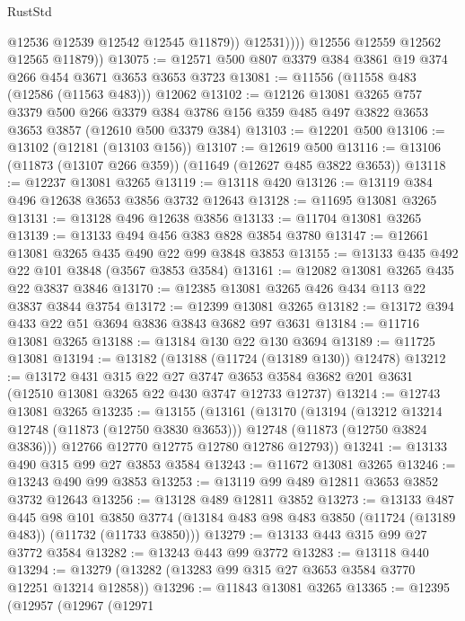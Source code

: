 \begin{lexlean}{RustStd}
\begin{coremodule}
                    @12536
                    @12539
                    @12542
                    @12545
                    @11879))
                @12531))))
        @12556
        @12559
        @12562
        @12565
        @11879))
@13075 := @12571 @500 @807 @3379 @384 @3861 @19 @374 @266 @454 @3671 @3653 @3653 @3723
@13081 := @11556 (@11558 @483 (@12586 (@11563 @483))) @12062
@13102 := @12126
    @13081
    @3265
    @757
    @3379
    @500
    @266
    @3379
    @384
    @3786
    @156
    @359
    @485
    @497
    @3822
    @3653
    @3653
    @3857
    (@12610 @500 @3379 @384)
@13103 := @12201 @500
@13106 := @13102 (@12181 (@13103 @156))
@13107 := @12619 @500
@13116 := @13106 (@11873 (@13107 @266 @359)) (@11649 (@12627 @485 @3822 @3653))
@13118 := @12237 @13081 @3265
@13119 := @13118 @420
@13126 := @13119 @384 @496 @12638 @3653 @3856 @3732 @12643
@13128 := @11695 @13081 @3265
@13131 := @13128 @496 @12638 @3856
@13133 := @11704 @13081 @3265
@13139 := @13133 @494 @456 @383 @828 @3854 @3780
@13147 := @12661 @13081 @3265 @435 @490 @22 @99 @3848 @3853
@13155 := @13133 @435 @492 @22 @101 @3848 (@3567 @3853 @3584)
@13161 := @12082 @13081 @3265 @435 @22 @3837 @3846
@13170 := @12385 @13081 @3265 @426 @434 @113 @22 @3837 @3844 @3754
@13172 := @12399 @13081 @3265
@13182 := @13172 @394 @433 @22 @51 @3694 @3836 @3843 @3682 @97 @3631
@13184 := @11716 @13081 @3265
@13188 := @13184 @130 @22 @130 @3694
@13189 := @11725 @13081
@13194 := @13182 (@13188 (@11724 (@13189 @130)) @12478)
@13212 := @13172
    @431
    @315
    @22
    @27
    @3747
    @3653
    @3584
    @3682
    @201
    @3631
    (@12510 @13081 @3265 @22 @430 @3747 @12733 @12737)
@13214 := @12743 @13081 @3265
@13235 := @13155
    (@13161
      (@13170
        (@13194
          (@13212 @13214 @12748 (@11873 (@12750 @3830 @3653)))
          @12748
          (@11873 (@12750 @3824 @3836)))
        @12766
        @12770
        @12775
        @12780
        @12786
        @12793))
@13241 := @13133 @490 @315 @99 @27 @3853 @3584
@13243 := @11672 @13081 @3265
@13246 := @13243 @490 @99 @3853
@13253 := @13119 @99 @489 @12811 @3653 @3852 @3732 @12643
@13256 := @13128 @489 @12811 @3852
@13273 := @13133
    @487
    @445
    @98
    @101
    @3850
    @3774
    (@13184 @483 @98 @483 @3850 (@11724 (@13189 @483)) (@11732 (@11733 @3850)))
@13279 := @13133 @443 @315 @99 @27 @3772 @3584
@13282 := @13243 @443 @99 @3772
@13283 := @13118 @440
@13294 := @13279 (@13282 (@13283 @99 @315 @27 @3653 @3584 @3770 @12251 @13214 @12858))
@13296 := @11843 @13081 @3265
@13365 := @12395
    (@12957
      (@12967
        (@12971

\end{coremodule}
\end{lexlean}
